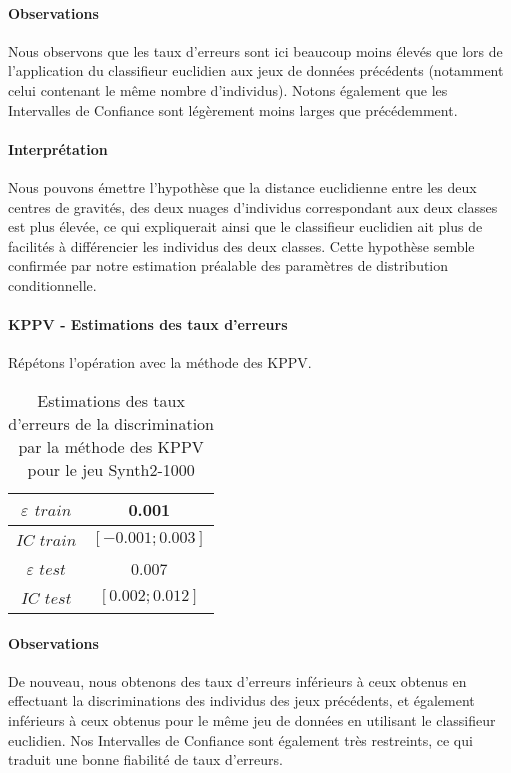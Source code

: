 \documentclass{report}
\begin{document}
\paragraph{Observations}
Nous observons que les taux d'erreurs sont ici beaucoup moins élevés que lors de l'application du classifieur euclidien aux jeux de données précédents (notamment celui contenant le même nombre d'individus). Notons également que les Intervalles de Confiance sont légèrement moins larges que précédemment.

\paragraph{Interprétation}
Nous pouvons émettre l'hypothèse que la distance euclidienne entre les deux centres de gravités, des deux nuages d'individus correspondant aux deux classes est plus élevée, ce qui expliquerait ainsi que le classifieur euclidien ait plus de facilités à différencier les individus des deux classes. Cette hypothèse semble confirmée par notre estimation préalable des paramètres de distribution conditionnelle.

\newpage
\paragraph{KPPV - Estimations des taux d'erreurs}
Répétons l'opération avec la méthode des KPPV.

\begin{table}[h!]
    \centering
    \caption{Estimations des taux d'erreurs de la discrimination par la méthode des KPPV pour le jeu Synth2-1000}
    \label{tab:table1}
    \def\arraystretch{1.5}
    \begin{tabular}{c|c}
        $\varepsilon$ $train$ & 0.001 \\
        \hline
        $IC$ $train$ & $[-0.001; 0.003]$ \\
        \hline
        $\varepsilon$ $test$ & 0.007 \\
        \hline
        $IC$ $test$ & $[0.002 ; 0.012]$ \\
    \end{tabular}
\end{table}

\paragraph{Observations}
De nouveau, nous obtenons des taux d'erreurs inférieurs à ceux obtenus en effectuant la discriminations des individus des jeux précédents, et également inférieurs à ceux obtenus pour le même jeu de données en utilisant le classifieur euclidien. Nos Intervalles de Confiance sont également très restreints, ce qui traduit une bonne fiabilité de taux d'erreurs.
\end{document}
